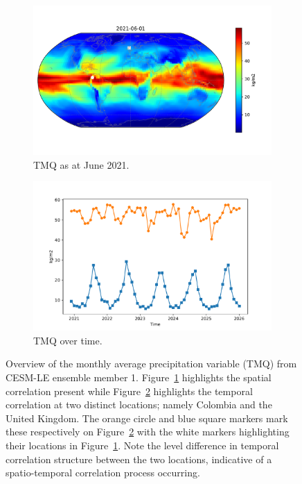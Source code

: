 \begin{figure}[htbp!] 
	\centering
	\begin{subfigure}[b]{0.45\textwidth}
		\includegraphics[width=\textwidth]{TMQ_example}
		\caption{TMQ as at June 2021.}
		\label{fig:precip_june}   
	\end{subfigure}             
	\begin{subfigure}[b]{0.45\textwidth}
		\includegraphics[width=\textwidth]{TMQ_example_temp}
		\caption{TMQ over time.}
		\label{fig:precip_temp}
	\end{subfigure}             
	\caption[Overview of Precipitation variable]{Overview of the monthly average precipitation variable (TMQ) from CESM-LE ensemble member 1. Figure~\ref{fig:precip_june} highlights the spatial correlation present while Figure~\ref{fig:precip_temp} highlights the temporal correlation at two distinct locations; namely Colombia and the United Kingdom. The orange circle and blue square markers mark these respectively on Figure~\ref{fig:precip_temp} with the white markers highlighting their locations in Figure~\ref{fig:precip_june}. Note the level difference in temporal correlation structure between the two locations, indicative of a spatio-temporal correlation process occurring.}
	\label{fig:precip_overview}
\end{figure}

